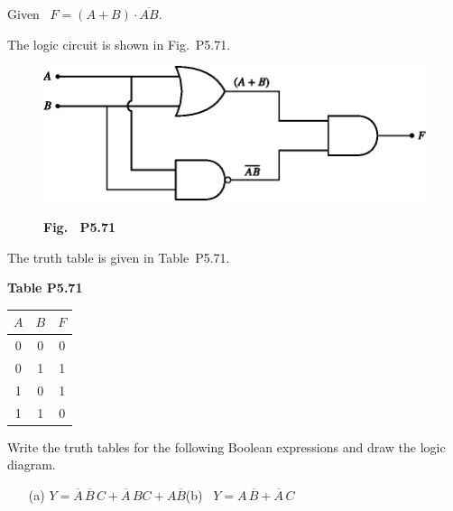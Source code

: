 \begin{solution}
Given~ $F=(A+B)\cdot \overline{AB}$.

The logic circuit is shown in Fig.~P5.71.
\begin{figure}[H]
\centering
\includegraphics{chap5/figP5.68.eps}

\smallskip
{\bf Fig.~ P5.71}
\end{figure}


The truth table is given in Table~P5.71.
\begin{table}[H]
\centering
{\bf Table P5.71}

\medskip
\tabcolsep=10pt
\renewcommand{\arraystretch}{1.2}
\begin{tabular}{|cc|c|}
\hline
\boldmath$A$ & \boldmath$B$ & \boldmath$F$\\
\hline
0 & 0 & 0\\
0 & 1 & 1\\
1 & 0 & 1\\
1 & 1 & 0\\
\hline
\end{tabular}
\end{table}
\end{solution}

\begin{problem}\label{prob5.72}
Write the truth tables for the following Boolean expressions and draw the logic diagram.
\begin{itemize}
\item[(a)] $Y=\overline{A}\,\overline{B}\,C+\overline{A}\,BC+A\overline{B}$\qquad (b)~ $Y=A\,\overline{B}+\overline{A}\,C$
\end{itemize}
\end{problem}

